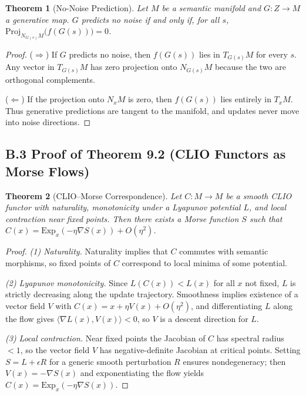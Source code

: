 \documentclass[11pt,a4paper,twocolumn]{article}
\newtheorem*{theorem*}{Theorem}
\begin{document}
\begin{theorem*}[No-Noise Prediction]
Let $M$ be a semantic manifold and $G: Z \to M$ a generative map.
$G$ predicts no noise if and only if, for all $s$,
$\mathrm{Proj}_{N_{G(s)}M}\!\big(f(G(s))\big) = 0$.
\end{theorem*}

\begin{proof}
($\Rightarrow$) If $G$ predicts no noise, then $f(G(s))$ lies in
$T_{G(s)}M$ for every $s$. Any vector in $T_{G(s)}M$ has zero
projection onto $N_{G(s)}M$ because the two are orthogonal complements.

($\Leftarrow$) If the projection onto $N_xM$ is zero, then $f(G(s))$
lies entirely in $T_xM$. Thus generative predictions are tangent to the
manifold, and updates never move into noise directions.
\end{proof}

\subsection*{B.3 Proof of Theorem 9.2 (CLIO Functors as Morse Flows)}

\begin{theorem*}[CLIO--Morse Correspondence]
Let $C: M \to M$ be a smooth CLIO functor with naturality, monotonicity
under a Lyapunov potential $L$, and local contraction near fixed points.
Then there exists a Morse function $S$ such that
$C(x) = \mathrm{Exp}_x(-\eta \nabla S(x)) + O(\eta^2)$.
\end{theorem*}

\begin{proof}
\textit{(1) Naturality.} Naturality implies that $C$ commutes with
semantic morphisms, so fixed points of $C$ correspond to local minima
of some potential.

\textit{(2) Lyapunov monotonicity.} Since $L(C(x)) < L(x)$ for all $x$
not fixed, $L$ is strictly decreasing along the update trajectory.
Smoothness implies existence of a vector field $V$ with
$C(x) = x + \eta V(x) + O(\eta^2)$, and differentiating $L$ along the
flow gives $\langle \nabla L(x), V(x) \rangle < 0$, so $V$ is a descent
direction for $L$.

\textit{(3) Local contraction.} Near fixed points the Jacobian of $C$
has spectral radius $<1$, so the vector field $V$ has negative-definite
Jacobian at critical points. Setting $S = L + \epsilon R$ for a generic
smooth perturbation $R$ ensures nondegeneracy; then $V(x) = -\nabla
S(x)$ and exponentiating the flow yields
$C(x) = \mathrm{Exp}_x(-\eta \nabla S(x))$.
\end{proof}
\end{document}
